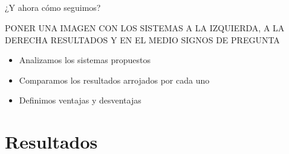 \documentclass[]{beamer}
\begin{document}
\subsection*{}
\begin{frame}{¿Y ahora cómo seguimos?}


    PONER UNA IMAGEN CON LOS SISTEMAS A LA IZQUIERDA, A LA DERECHA RESULTADOS Y EN EL MEDIO SIGNOS DE PREGUNTA
    \begin{itemize}
        \item Analizamos los sistemas propuestos
        \item Comparamos los resultados arrojados por cada uno
        \item Definimos ventajas y desventajas
    \end{itemize}

\end{frame}


\section{Resultados}
\end{document}
